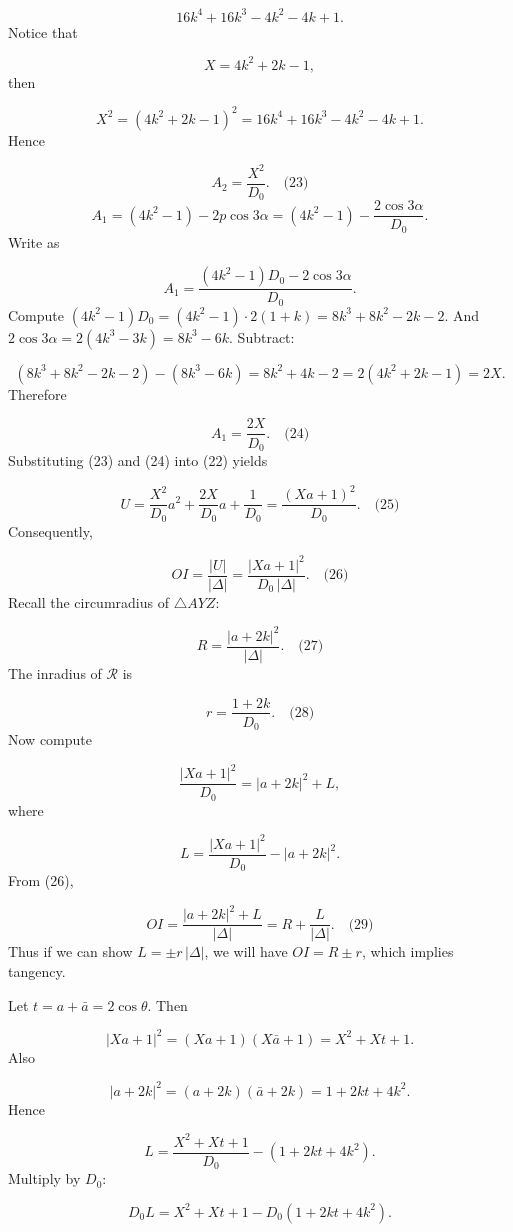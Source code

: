 \[
  16k^4 + 16k^3 - 4k^2 - 4k + 1.
  \]
Notice that\par
\[
  X = 4k^2 + 2k - 1,
  \]
then\par
\[
  X^2 = (4k^2+2k-1)^2 = 16k^4 + 16k^3 - 4k^2 - 4k + 1.
  \]
Hence\par
\[
  A_2 = \frac{X^2}{D_0}. \quad\text{(23)}
  \]
\[
  A_1 = (4k^2-1) - 2p\cos3\alpha = (4k^2-1) - \frac{2\cos3\alpha}{D_0}.
  \]
Write as\par
\[
  A_1 = \frac{(4k^2-1)D_0 - 2\cos3\alpha}{D_0}.
  \]
Compute \((4k^2-1)D_0 = (4k^2-1)\cdot 2(1+k) = 8k^3 + 8k^2 - 2k - 2.\) And \(2\cos3\alpha = 2(4k^3-3k) = 8k^3 - 6k.\) Subtract:\par
\[
  (8k^3+8k^2-2k-2) - (8k^3-6k) = 8k^2 + 4k - 2 = 2(4k^2+2k-1) = 2X.
  \]
Therefore\par
\[
  A_1 = \frac{2X}{D_0}. \quad\text{(24)}
  \]
Substituting (23) and (24) into (22) yields\par
\[
U = \frac{X^2}{D_0} a^2 + \frac{2X}{D_0} a + \frac{1}{D_0} = \frac{(X a + 1)^2}{D_0}. \quad\text{(25)}
\]
Consequently,\par
\[
OI = \frac{|U|}{|\Delta|} = \frac{|X a + 1|^2}{D_0\, |\Delta|}. \quad\text{(26)}
\]
\smallskip
{}
Recall the circumradius of \(\triangle AYZ\):\par
\[
R = \frac{|a+2k|^2}{|\Delta|}. \quad\text{(27)}
\]
The inradius of \(\mathcal{R}\) is\par
\[
r = \frac{1+2k}{D_0}. \quad\text{(28)}
\]
Now compute\par
\[
\frac{|X a + 1|^2}{D_0} = |a+2k|^2 + L,
\]
where\par
\[
L = \frac{|X a + 1|^2}{D_0} - |a+2k|^2.
\]
From (26),\par
\[
OI = \frac{|a+2k|^2 + L}{|\Delta|} = R + \frac{L}{|\Delta|}. \quad\text{(29)}
\]
Thus if we can show \(L = \pm r\,|\Delta|\), we will have \(OI = R \pm r\), which implies tangency.\par
Let \(t = a + \bar a = 2\cos\theta\). Then\par
\[
|X a + 1|^2 = (X a + 1)(X \bar a + 1) = X^2 + X t + 1.
\]
Also\par
\[
|a+2k|^2 = (a+2k)(\bar a+2k) = 1 + 2k t + 4k^2.
\]
Hence\par
\[
L = \frac{X^2 + X t + 1}{D_0} - (1 + 2k t + 4k^2).
\]
Multiply by \(D_0\):\par
\[
D_0 L = X^2 + X t + 1 - D_0(1 + 2k t + 4k^2).
\]
